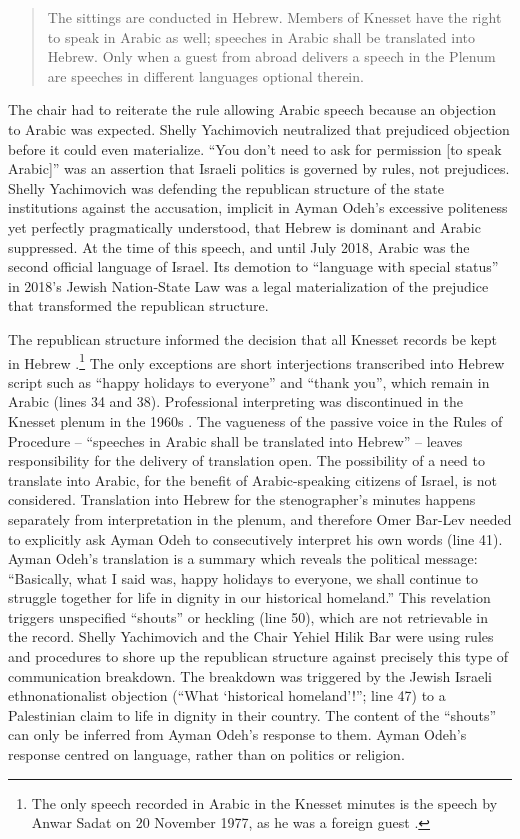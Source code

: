 \documentclass[output=paper,arabicfont]{langscibook}
\begin{document}
\begin{quote}
The sittings are conducted in Hebrew. Members of Knesset have the right to speak in Arabic as well; speeches in Arabic shall be translated into Hebrew. Only when a guest from abroad delivers a speech in the Plenum are speeches in different languages optional therein. \citep{knesset-nd-b}
\end{quote}

The chair had to reiterate the rule allowing Arabic speech because an objection to Arabic was expected. Shelly Yachimovich neutralized that prejudiced objection before it could even materialize. “You don’t need to ask for permission [to speak Arabic]” was an assertion that Israeli politics is governed by rules, not prejudices. Shelly Yachimovich was defending the republican structure of the state institutions against the accusation, implicit in Ayman Odeh’s excessive politeness yet perfectly pragmatically understood, that Hebrew is dominant and Arabic suppressed. At the time of this speech, and until July 2018, Arabic was the second official language of Israel. Its demotion to “language with special status” in 2018’s Jewish Nation-State Law was a legal materialization of the prejudice that transformed the republican structure. 

The republican structure informed the decision that all Knesset records be kept in Hebrew \citep[articles 22 and 38]{knesset2012a}.\footnote{The only speech recorded in Arabic in the Knesset minutes is the speech by Anwar Sadat on 20 November 1977, as he was a foreign guest \citep{knesset1977a}.} The only exceptions are short interjections transcribed into Hebrew script such as “happy holidays to everyone” and “thank you”, which remain in Arabic (lines 34 and 38). Professional interpreting was discontinued in the Knesset plenum in the 1960s \citep[32–37]{hawker2019a}. The vagueness of the passive voice in the Rules of Procedure – “speeches in Arabic shall be translated into Hebrew” – leaves responsibility for the delivery of translation open. The possibility of a need to translate into Arabic, for the benefit of Arabic-speaking citizens of Israel, is not considered. Translation into Hebrew for the stenographer’s minutes happens separately from interpretation in the plenum, and therefore Omer Bar-Lev needed to explicitly ask Ayman Odeh to consecutively interpret his own words (line 41). Ayman Odeh’s translation is a summary which reveals the political message: “Basically, what I said was, happy holidays to everyone, we shall continue to struggle together for life in dignity in our historical homeland.” This revelation triggers unspecified “shouts” or heckling (line 50), which are not retrievable in the record. Shelly Yachimovich and the Chair Yehiel Hilik Bar were using rules and procedures to shore up the republican structure against precisely this type of communication breakdown. The breakdown was triggered by the Jewish Israeli ethnonationalist objection (“What ‘historical homeland’!”; line 47) to a Palestinian claim to life in dignity in their country. The content of the “shouts” can only be inferred from Ayman Odeh’s response to them. Ayman Odeh’s response centred on language, rather than on politics or religion.
\end{document}
